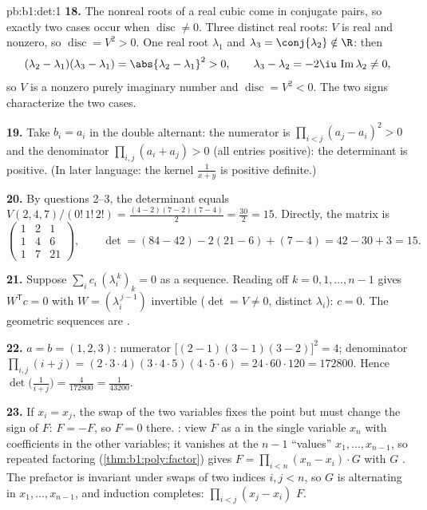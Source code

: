 \begin{solution}{pb:b1:det:1}
\textbf{18.} The nonreal roots of a real cubic come in conjugate
pairs, so exactly two cases occur when $\operatorname{disc} \neq
0$. Three distinct real roots: $V$ is real and nonzero, so
$\operatorname{disc} = V^2 > 0$. One real root $\lambda_1$ and
$\lambda_3 = \conj{\lambda_2} \notin \R$: then
\[
(\lambda_2 - \lambda_1)(\lambda_3 - \lambda_1) =
\abs{\lambda_2 - \lambda_1}^2 > 0,
\qquad
\lambda_3 - \lambda_2 = -2\iu\,\operatorname{Im}\lambda_2 \neq 0,
\]
so $V$ is a nonzero purely imaginary number and
$\operatorname{disc} = V^2 < 0$. The two signs characterize the
two cases.

\textbf{19.} Take $b_i = a_i$ in the double alternant: the
numerator is $\prod_{i<j}(a_j - a_i)^2 > 0$ and the denominator
$\prod_{i,j}(a_i + a_j) > 0$ (all entries positive): the
determinant is positive. (In later language: the kernel
$\frac1{x+y}$ is positive definite.)

\textbf{20.} By questions 2--3, the determinant equals
$V(2,4,7)/(0!\,1!\,2!) = \frac{(4-2)(7-2)(7-4)}{2} =
\frac{30}{2} = 15$. Directly, the matrix is
\[
\begin{pmatrix}
1 & 2 & 1\\
1 & 4 & 6\\
1 & 7 & 21
\end{pmatrix},
\qquad
\det = (84 - 42) - 2(21 - 6) + (7 - 4) = 42 - 30 + 3 = 15 .
\]

\textbf{21.} Suppose $\sum_i c_i\,(\lambda_i^{\,k})_{k} = 0$ as
a sequence. Reading off $k = 0, 1, \dots, n-1$ gives $W^{\mathsf
T}c = 0$ with $W = (\lambda_i^{\,j-1})$ invertible ($\det = V
\neq 0$, distinct $\lambda_i$): $c = 0$. The geometric sequences
are .

\textbf{22.} $a = b = (1, 2, 3)$: numerator $\bigl[(2-1)(3-1)
(3-2)\bigr]^2 = 4$; denominator $\prod_{i,j}(i + j) =
(2\cdot3\cdot4)(3\cdot4\cdot5)(4\cdot5\cdot6) = 24\cdot60\cdot120
= 172800$. Hence $\det\bigl(\frac1{i+j}\bigr) = \frac{4}{172800}
= \frac1{43200}$.

\textbf{23.} If $x_i = x_j$, the swap of the two variables fixes
the point but must change the sign of $F$: $F = -F$, so $F = 0$
there. : view $F$ as a  in the single
variable $x_n$ with coefficients in the other variables; it
vanishes at the $n - 1$ ``values'' $x_1, \dots, x_{n-1}$, so
repeated factoring (\cref{thm:b1:poly:factor}) gives $F =
\prod_{i<n}(x_n - x_i)\cdot G$ with $G$ . The
prefactor is invariant under swaps of two indices $i, j < n$, so
$G$ is alternating in $x_1, \dots, x_{n-1}$, and induction
completes: $\prod_{i<j}(x_j - x_i)$  $F$.


\end{solution}
